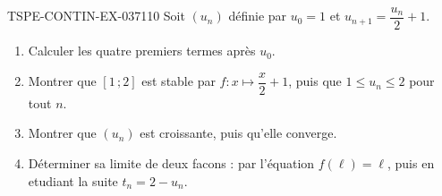 \begin{exercice}{TSPE-CONTIN-EX-037}{1}{10}
Soit $(u_n)$ définie par $u_0 = 1$ et $u_{n+1} = \dfrac{u_n}{2} + 1$.
\begin{enumerate}
  \item Calculer les quatre premiers termes après $u_0$.
  \item Montrer que $[1\,;2]$ est stable par $f : x \mapsto \dfrac{x}{2} + 1$, puis que $1 \leq u_n \leq 2$ pour tout $n$.
  \item Montrer que $(u_n)$ est croissante, puis qu'elle converge.
  \item Déterminer sa limite de deux facons : par l'équation $f(\ell) = \ell$, puis en etudiant la suite $t_n = 2 - u_n$.
\end{enumerate}
\end{exercice}
